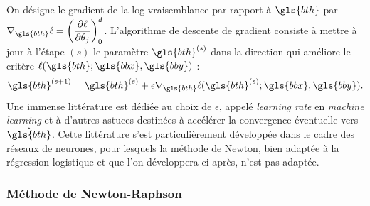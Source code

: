 On désigne le gradient de la log-vraisemblance par rapport à $\gls{bth}$ par $\nabla_{\gls{bth}} \ell = \left( \dfrac{\partial \ell}{\partial \theta_j} \right)_0^d$. L'algorithme de descente de gradient consiste à mettre à jour à l'étape $(s)$ le paramètre $\gls{bth}^{(s)}$ dans la direction qui améliore le critère $\ell(\gls{bth};\gls{bbx},\gls{bby})$ : $$\gls{bth}^{(s+1)} = \gls{bth}^{(s)} + \epsilon \nabla_{\gls{bth}} \ell(\gls{bth}^{(s)};\gls{bbx},\gls{bby}).$$ Une immense littérature est dédiée au choix de $\epsilon$, appelé \textit{learning rate} en \textit{machine learning} et à d'autres astuces destinées à accélérer la convergence éventuelle vers $\hat{\gls{bth}}$. Cette littérature s'est particulièrement développée dans le cadre des réseaux de neurones, pour lesquels la méthode de Newton, bien adaptée à la régression logistique et que l'on développera ci-après, n'est pas adaptée.

\subsubsection{Méthode de Newton-Raphson}

